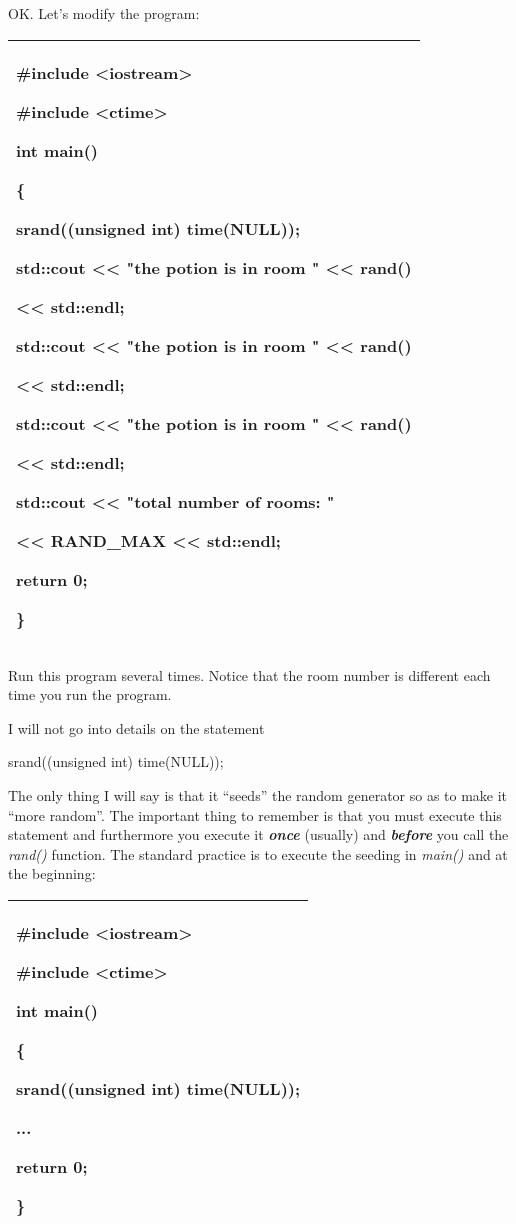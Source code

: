 \documentclass[
]{article}
\begin{document}
OK. Let's modify the program:

\begin{longtable}[]{@{}l@{}}
\toprule
\endhead
\begin{minipage}[t]{0.97\columnwidth}\raggedright
\#include \textless iostream\textgreater{}

\#include \textless ctime\textgreater{}

int main()

\{

srand((unsigned int) time(NULL));

std::cout \textless\textless{} "the potion is in room "
\textless\textless{} rand()

\textless\textless{} std::endl;

std::cout \textless\textless{} "the potion is in room "
\textless\textless{} rand()

\textless\textless{} std::endl;

std::cout \textless\textless{} "the potion is in room "
\textless\textless{} rand()

\textless\textless{} std::endl;

std::cout \textless\textless{} "total number of rooms: "

\textless\textless{} RAND\_MAX \textless\textless{} std::endl;

return 0;

\}\strut
\end{minipage}\tabularnewline
\bottomrule
\end{longtable}

Run this program several times. Notice that the room number is different
each time you run the program.

I will not go into details on the statement

srand((unsigned int) time(NULL));

The only thing I will say is that it ``seeds'' the random generator so
as to make it ``more random''. The important thing to remember is that
you must execute this statement and furthermore you execute it
\emph{\textbf{once}} (usually) and \emph{\textbf{before}} you call the
\emph{rand()} function. The standard practice is to execute the seeding
in \emph{main()} and at the beginning:

\begin{longtable}[]{@{}l@{}}
\toprule
\endhead
\begin{minipage}[t]{0.97\columnwidth}\raggedright
\#include \textless iostream\textgreater{}

\#include \textless ctime\textgreater{}

int main()

\{

srand((unsigned int) time(NULL));

...

return 0;

\}\strut
\end{minipage}\tabularnewline
\bottomrule
\end{longtable}
\end{document}
